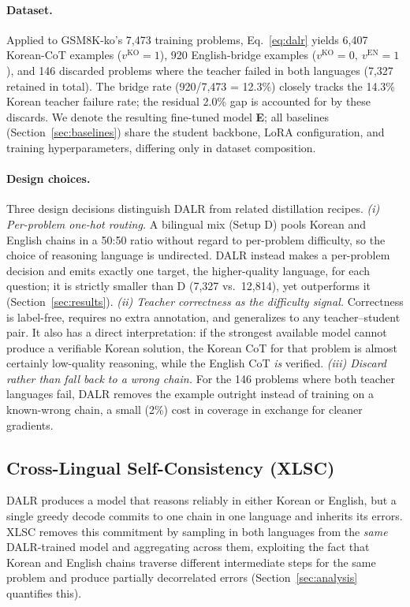 \documentclass{article}
\begin{document}
\paragraph{Dataset.}
Applied to GSM8K-ko's 7,473 training problems, Eq.~\ref{eq:dalr}
yields 6,407 Korean-CoT examples ($v^{\text{KO}}{=}1$), 920
English-bridge examples ($v^{\text{KO}}{=}0,\ v^{\text{EN}}{=}1$),
and 146 discarded problems where the teacher failed in both
languages (7,327 retained in total). The bridge rate (920/7,473 =
12.3\%) closely tracks the 14.3\% Korean teacher failure rate; the
residual 2.0\% gap is accounted for by these discards. We denote the resulting
fine-tuned model \textbf{E}; all baselines
(Section~\ref{sec:baselines}) share the student backbone, LoRA
configuration, and training hyperparameters, differing only in
dataset composition.

\paragraph{Design choices.}
Three design decisions distinguish DALR from related distillation
recipes. \emph{(i) Per-problem one-hot routing.} A bilingual mix
(Setup D) pools Korean and English chains in a 50:50 ratio without
regard to per-problem difficulty, so the choice of reasoning
language is undirected. DALR instead makes a per-problem decision
and emits exactly one target, the higher-quality language, for each
question; it is strictly smaller than D (7,327 vs.\ 12,814), yet
outperforms it (Section~\ref{sec:results}). \emph{(ii) Teacher
correctness as the difficulty signal.} Correctness is label-free,
requires no extra annotation, and generalizes to any teacher--student
pair. It also has a direct interpretation: if the strongest
available model cannot produce a verifiable Korean solution, the
Korean CoT for that problem is almost certainly low-quality
reasoning, while the English CoT \emph{is} verified.
\emph{(iii) Discard rather than fall back to a wrong chain.}
For the 146 problems where both teacher languages fail, DALR removes
the example outright instead of training on a known-wrong chain, a
small (2\%) cost in coverage in exchange for cleaner gradients.

\subsection{Cross-Lingual Self-Consistency (XLSC)}
\label{sec:xlsc}
DALR produces a model that reasons reliably in either Korean or
English, but a single greedy decode commits to one chain in one
language and inherits its errors. XLSC removes this commitment by
sampling in both languages from the \emph{same} DALR-trained model
and aggregating across them, exploiting the fact that Korean and
English chains traverse different intermediate steps for the same
problem and produce partially decorrelated errors
(Section~\ref{sec:analysis} quantifies this).
\end{document}
